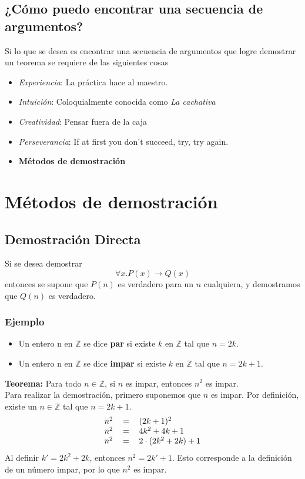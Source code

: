 \documentclass[../main.tex]{subfiles}
\begin{document}
\subsection{¿Cómo puedo encontrar una secuencia de argumentos?}
Si lo que se desea es encontrar una secuencia de argumentos que logre demostrar un teorema se requiere de las siguientes cosas
\begin{itemize}
    \item \textit{Experiencia}: La práctica hace al maestro.
    \item \textit{Intuición}: Coloquialmente conocida como \textit{La cachativa}
    \item \textit{Creatividad}: Pensar fuera de la caja
    \item \textit{Perseverancia}: If at first you don't succeed, try, try again.
    \item \textbf{Métodos de demostración}
\end{itemize}

\section{Métodos de demostración}
\subsection{Demostración Directa}
Si se desea demostrar
\[ \forall x . P(x) \rightarrow Q(x) \]
entonces se supone que $P(n)$ es verdadero para un $n$ cualquiera, y demostramos que $Q(n)$ es verdadero.
\subsubsection*{Ejemplo}
\label{sec:nimpar}
\begin{itemize}
    \item Un entero n en $\mathds{Z}$ se dice \textbf{par} si existe $k$ en $\mathds{Z}$ tal que $n = 2k$.
    \item Un entero n en $\mathds{Z}$ se dice \textbf{impar} si existe $k$ en $\mathds{Z}$ tal que $n = 2k + 1$.
\end{itemize}
\textbf{Teorema:} Para todo $n \in \mathds{Z}$, si $n$ es impar, entonces $n^2$ es impar.\\
Para realizar la demostración, primero suponemos que $n$ es impar. Por definición, existe un $n \in \mathds{Z}$ tal que $n = 2k + 1$.
\[
    \begin{tabular}{rcl}
        $n^2$ & $=$ & $(2k + 1)^2$\\
        $n^2$ & $=$ & $4k^{2} + 4k + 1$\\
        $n^2$ & $=$ & $2 \cdot{} (2k^{2} + 2k) + 1$\\
    \end{tabular}
\]
Al definir $k' = 2k^2 + 2k$, entonces $n^2 = 2k' + 1$. Esto corresponde a la definición de un número impar, por lo que $n^2$ es impar.
\end{document}
